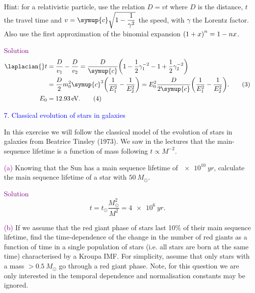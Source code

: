 \documentclass[UTF8, 12pt, a4paper, oneside, twocolumn, fontset=none]{ctexart}
\begin{document}
\noindent Hint: for a relativistic particle, use the relation $D=vt$ where $D$ is the distance, $t$ the travel time and $v=\symup{c}\sqrt{1-\dfrac{1}{\gamma^{2}}}$ the speed, with $\gamma$ the Lorentz factor. Also use the first approximation of the binomial expansion $\mleft(1+x\mright)^{n}=1-nx$.

\hspace*{\fill}

\noindent\textcolor{purple}{Solution}
\begin{align}
\laplacian{}t&=\frac{D}{v_{1}}-\frac{D}{v_{2}}=\frac{D}{\symup{c}}\mleft(1-\frac{1}{2}\gamma_{1}^{-2}-1+\frac{1}{2}\gamma_{2}^{-2}\mright)\notag\\
&=\frac{D}{2}m_{0}^{2}\symup{c}^{3}\mleft(\frac{1}{E_{1}^{2}}-\frac{1}{E_{2}^{2}}\mright)=E_{0}^{2}\frac{D}{2\symup{c}}\mleft(\frac{1}{E_{1}^{2}}-\frac{1}{E_{2}^{2}}\mright).\tag{3}\\
E_{0}&=\qty{12.93}{eV}.\tag{4}
\end{align}

\hspace*{\fill}

\noindent\textcolor{blue}{7. Classical evolution of stars in galaxies}

\noindent In this exercise we will follow the classical model of the evolution of stars in galaxies from Beatrice Tinsley (1973). We saw in the lectures that the main-sequence lifetime is a function of mass following $t\propto{}M^{-2}$.

\hspace*{\fill}

\noindent\textcolor{purple}{(a)} Knowing that the Sun has a main sequence lifetime of $\qty{e10}{yr}$, calculate the main sequence lifetime of a star with $\qty{50}{M_{\odot}}$.

\hspace*{\fill}

\noindent\textcolor{purple}{Solution}
\begin{equation}
t=t_{\odot}\frac{M_{\odot}^{2}}{M^{2}}=\qty{4e6}{yr}.\tag{1}
\end{equation}

\hspace*{\fill}

\noindent\textcolor{purple}{(b)} If we assume that the red giant phase of stars last 10\% of their main sequence lifetime, find the time-dependence of the change in the number of red giants as a function of time in a single population of stars (i.e. all stars are born at the same time) characterised by a Kroupa IMF. For simplicity, assume that only stars with a mass $>\qty{0.5}{M_{\odot}}$ go through a red giant phase. Note, for this question we are only interested in the temporal dependence and normalisation constants may be ignored.
\end{document}
